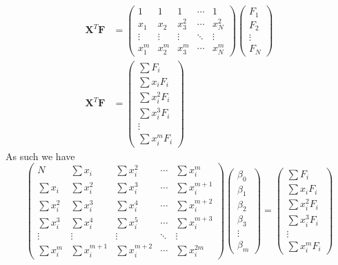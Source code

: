 \documentclass[../../../main.tex]{subfiles}
\begin{document}
\begin{align*}
    \mathbf{X}^T \mathbf{F} & =
    \begin{pmatrix}
        1      & 1      & 1      & \cdots & 1      \\
        x_1    & x_2    & x_3^2  & \cdots & x_N^2  \\
        \vdots & \vdots & \vdots & \ddots & \vdots \\
        x_1^m  & x_2^m  & x_3^m  & \cdots & x_N^m
    \end{pmatrix}
    \begin{pmatrix}
        F_1 \\ F_2 \\ \vdots \\ F_N
    \end{pmatrix}  \\
    \mathbf{X}^T \mathbf{F} & =
    \begin{pmatrix}
        \sum F_i \\ \sum x_i F_i \\ \sum x_i^2 F_i \\ \sum x_i^3 F_i \\ \vdots \\ \sum x_i^m F_i
    \end{pmatrix}
\end{align*}
As such we have
\begin{equation*}
    \begin{pmatrix}
        N            & \sum x_i       & \sum x_i^2     & \cdots & \sum x_i^m     \\
        \sum x_i     & \sum x_i^2     & \sum x_i^3     & \cdots & \sum x_i^{m+1} \\
        \sum x_i^2   & \sum x_i^3     & \sum x_i^4     & \cdots & \sum x_i^{m+2} \\
        \sum x_i^3   & \sum x_i^4     & \sum x_i^5     & \cdots & \sum x_i^{m+3} \\
        \vdots       & \vdots         & \vdots         & \ddots & \vdots         \\
        \sum x_i^{m} & \sum x_i^{m+1} & \sum x_i^{m+2} & \cdots & \sum x_i^{2m}
    \end{pmatrix}
    \begin{pmatrix}
        \beta_0 \\
        \beta_1 \\
        \beta_2 \\
        \beta_3 \\
        \vdots  \\
        \beta_m
    \end{pmatrix}
    =
    \begin{pmatrix}
        \sum F_i \\ \sum x_i F_i \\ \sum x_i^2 F_i \\ \sum x_i^3 F_i \\ \vdots \\ \sum x_i^m F_i
    \end{pmatrix}
\end{equation*}
\end{document}
